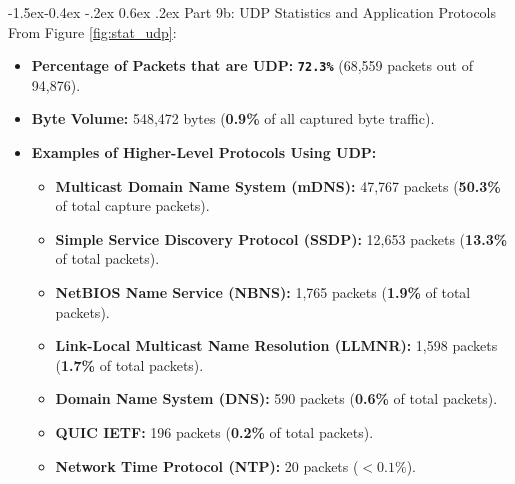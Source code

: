 \documentclass[11pt,a4paper]{article}
\makeatletter
\renewcommand\subsection{\@startsection{subsection}{2}{\z@}%
  {-1.5ex\@plus -0.4ex \@minus -.2ex}%
  {0.6ex \@plus .2ex}%
  {\normalfont\large\bfseries}}
\makeatother
\begin{document}
\subsection{Part 9b: UDP Statistics and Application Protocols}
From Figure \ref{fig:stat_udp}:
\begin{itemize}
  \item \textbf{Percentage of Packets that are UDP:} \textbf{\texttt{72.3\%}} (68,559 packets out of 94,876).
  \item \textbf{Byte Volume:} 548,472 bytes (\textbf{0.9\%} of all captured byte traffic).
  \item \textbf{Examples of Higher-Level Protocols Using UDP:}
  \begin{itemize}
    \item \textbf{Multicast Domain Name System (mDNS):} 47,767 packets (\textbf{50.3\%} of total capture packets).
    \item \textbf{Simple Service Discovery Protocol (SSDP):} 12,653 packets (\textbf{13.3\%} of total packets).
    \item \textbf{NetBIOS Name Service (NBNS):} 1,765 packets (\textbf{1.9\%} of total packets).
    \item \textbf{Link-Local Multicast Name Resolution (LLMNR):} 1,598 packets (\textbf{1.7\%} of total packets).
    \item \textbf{Domain Name System (DNS):} 590 packets (\textbf{0.6\%} of total packets).
    \item \textbf{QUIC IETF:} 196 packets (\textbf{0.2\%} of total packets).
    \item \textbf{Network Time Protocol (NTP):} 20 packets ($<0.1\%$).
  \end{itemize}
\end{itemize}
\end{document}
